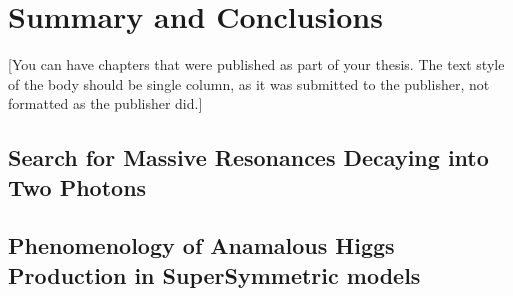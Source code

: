 \documentclass[14pt]{caltech_thesis}
\begin{document}
\part{Summary and Conclusions}


[You can have chapters that were published as part of your thesis. The
text style of the body should be single column, as it was submitted to
the publisher, not formatted as the publisher did.]

\printbibliography[heading=bibintoc]

 
\appendix

\chapter{Search for Massive Resonances Decaying into Two Photons}
\chapter{Phenomenology of Anamalous Higgs Production in SuperSymmetric models}

\printindex

\theendnotes

\end{document}
